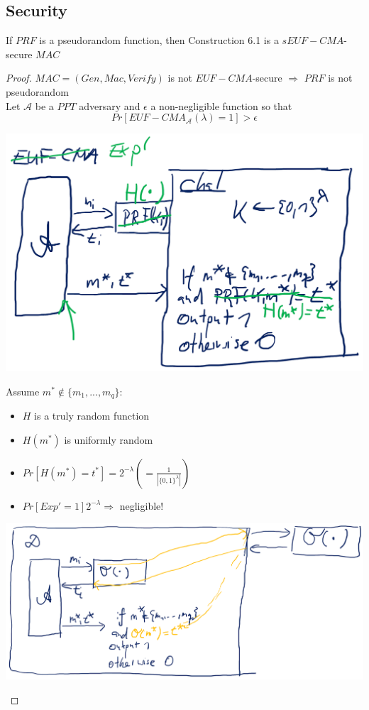 	\subsection{Security}
		\begin{theorem}\label{thm6.1}
			If $PRF$ is a pseudorandom function, then Construction 6.1 is a $sEUF-CMA$-secure $MAC$
		\end{theorem}
		\begin{proof}
			$MAC = (Gen,Mac,Verify)$ is not $EUF-CMA$-secure $\Rightarrow$ $PRF$ is not pseudorandom\\
			Let $\mathcal{A}$ be a $PPT$ adversary and $\epsilon$ a non-negligible function so that
			$$Pr[EUF-CMA_{\mathcal{A}}(\lambda) = 1] >\epsilon$$
			\begin{center}
				\includegraphics[width=140mm]{Graphics/Authentication/a6.png}
			\end{center}
			Assume $m^* \notin \{m_1,...,m_q\}$:
			\begin{itemize}
				\item $H$ is a truly random function
				\item $H(m^*)$ is uniformly random
				\item $Pr[H(m^*) = t^*] = 2^{-\lambda} (= \frac{1}{|\{0,1\}^{\lambda}|})$
				\item $Pr[Exp' = 1] 2^{-\lambda} \Rightarrow$ negligible!
			\end{itemize}
			\begin{center}
				\includegraphics[width=140mm]{Graphics/Authentication/a7.png}

\end{center}
\end{proof}
